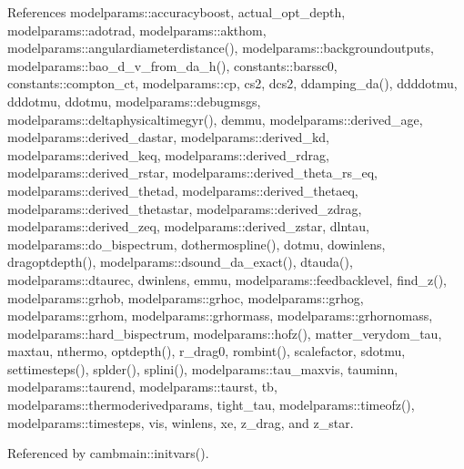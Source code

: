 References modelparams\+::accuracyboost, actual\+\_\+opt\+\_\+depth, modelparams\+::adotrad, modelparams\+::akthom, modelparams\+::angulardiameterdistance(), modelparams\+::backgroundoutputs, modelparams\+::bao\+\_\+d\+\_\+v\+\_\+from\+\_\+da\+\_\+h(), constants\+::barssc0, constants\+::compton\+\_\+ct, modelparams\+::cp, cs2, dcs2, ddamping\+\_\+da(), ddddotmu, dddotmu, ddotmu, modelparams\+::debugmsgs, modelparams\+::deltaphysicaltimegyr(), demmu, modelparams\+::derived\+\_\+age, modelparams\+::derived\+\_\+dastar, modelparams\+::derived\+\_\+kd, modelparams\+::derived\+\_\+keq, modelparams\+::derived\+\_\+rdrag, modelparams\+::derived\+\_\+rstar, modelparams\+::derived\+\_\+theta\+\_\+rs\+\_\+eq, modelparams\+::derived\+\_\+thetad, modelparams\+::derived\+\_\+thetaeq, modelparams\+::derived\+\_\+thetastar, modelparams\+::derived\+\_\+zdrag, modelparams\+::derived\+\_\+zeq, modelparams\+::derived\+\_\+zstar, dlntau, modelparams\+::do\+\_\+bispectrum, dothermospline(), dotmu, dowinlens, dragoptdepth(), modelparams\+::dsound\+\_\+da\+\_\+exact(), dtauda(), modelparams\+::dtaurec, dwinlens, emmu, modelparams\+::feedbacklevel, find\+\_\+z(), modelparams\+::grhob, modelparams\+::grhoc, modelparams\+::grhog, modelparams\+::grhom, modelparams\+::grhormass, modelparams\+::grhornomass, modelparams\+::hard\+\_\+bispectrum, modelparams\+::hofz(), matter\+\_\+verydom\+\_\+tau, maxtau, nthermo, optdepth(), r\+\_\+drag0, rombint(), scalefactor, sdotmu, settimesteps(), splder(), splini(), modelparams\+::tau\+\_\+maxvis, tauminn, modelparams\+::taurend, modelparams\+::taurst, tb, modelparams\+::thermoderivedparams, tight\+\_\+tau, modelparams\+::timeofz(), modelparams\+::timesteps, vis, winlens, xe, z\+\_\+drag, and z\+\_\+star.



Referenced by cambmain\+::initvars().

